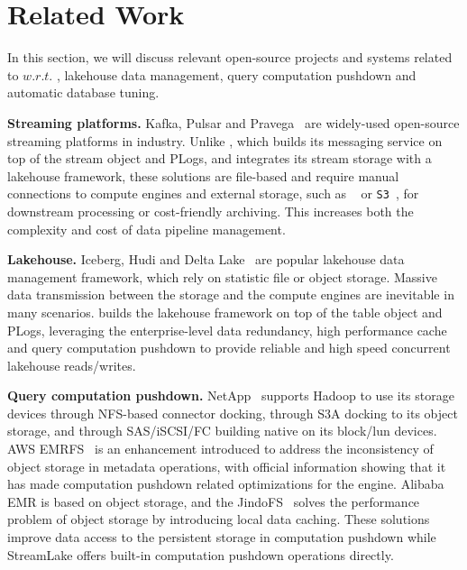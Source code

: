 \section{Related Work} 
\label{sec:related}


In this section, we will discuss relevant open-source projects and systems related to \sys $w.r.t.$ , lakehouse data management, query computation pushdown and automatic database tuning.

\noindent\textbf{Streaming platforms.} Kafka, Pulsar and Pravega~\cite{} are widely-used open-source streaming platforms in industry. Unlike \sys, which builds its messaging service on top of the stream object and PLogs, and integrates its stream storage with a lakehouse framework, these solutions are file-based and require manual connections to compute engines and external storage, such as \hdfs~\cite{} or \texttt{S3}~\cite{}, for downstream processing or cost-friendly archiving. This increases both the complexity and cost of data pipeline management.



\noindent\textbf{Lakehouse.} Iceberg, Hudi and Delta Lake~\cite{} are popular  lakehouse data management framework, which rely on statistic file or object storage. 
Massive data transmission between the storage and the compute engines are inevitable in many scenarios. 
 \sys builds the lakehouse framework on top of the table object and PLogs, leveraging the enterprise-level data redundancy, high performance cache and query computation pushdown to provide reliable and high speed concurrent lakehouse reads/writes. 



\noindent\textbf{Query computation pushdown.} NetApp~\cite{} supports Hadoop to use its storage devices through NFS-based connector docking, through S3A docking to its object storage, and through SAS/iSCSI/FC building native \hdfs on its block/lun devices. AWS EMRFS~\cite{} is an enhancement introduced to address the inconsistency of object storage in metadata operations, with official information showing that it has made computation pushdown related optimizations for the engine. Alibaba EMR is based on object storage, and the JindoFS~\cite{} solves the performance problem of object storage by introducing local data caching. These solutions improve data access to the persistent storage in computation pushdown while StreamLake offers built-in computation pushdown operations directly. 


